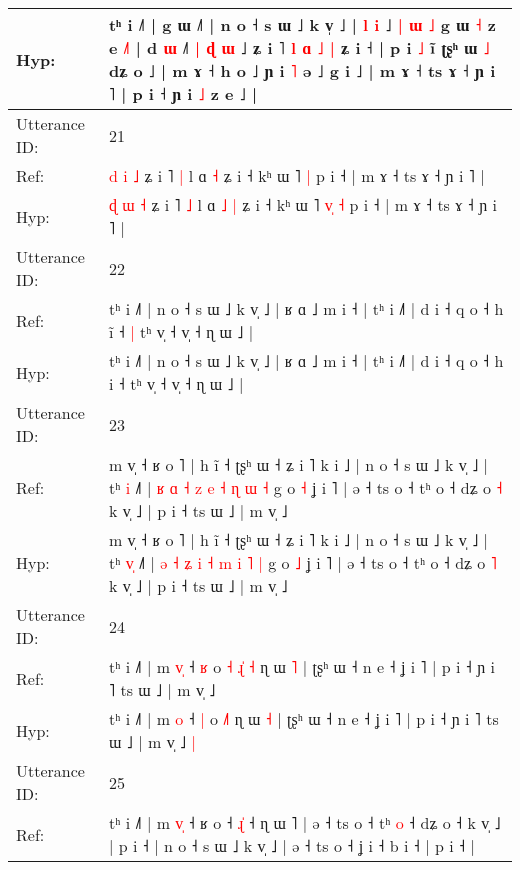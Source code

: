 \documentclass[10pt]{article}
\DeclareRobustCommand{\hl}[1]{{\textcolor{red}{#1}}}
\begin{document}
\begin{longtable}{ll}
 \\
Hyp: & tʰ i ˩˥ | g ɯ ˩˥ | n o ˧ s ɯ ˩ k v̩ ˩ | \hl{l} \hl{i} ˩\hl{}\hl{} \hl{|} \hl{ɯ} \hl{˩} g ɯ \hl{˧} z e \hl{˩}˥ | d \hl{ɯ} ˩˥\hl{ }\hl{|} \hl{ɖ} \hl{ɯ} ˩ ʑ i ˥ \hl{l} \hl{ɑ} \hl{˩} \hl{|} ʑ i ˧\hl{} | p i\hl{}\hl{} \hl{˩} ĩ\hl{}\hl{} ʈʂʰ ɯ \hl{˩} dʑ o ˩ | m ɤ ˧ h o ˩ ɲ i\hl{}\hl{} \hl{˥} ə ˩ g i ˩ | m ɤ ˧ ts ɤ ˧ ɲ i ˥ | p i ˧ ɲ i \hl{˩} z e\hl{}\hl{}\hl{}\hl{}\hl{} ˩ |
 \\
\midrule
Utterance ID: & 21 \\
Ref: & \hl{d} \hl{i} \hl{˩} ʑ i ˥ \hl{|} l ɑ\hl{}\hl{} \hl{˧} ʑ i ˧ kʰ ɯ ˥\hl{}\hl{}\hl{} \hl{|} p i ˧ | m ɤ ˧ ts ɤ ˧ ɲ i ˥ |
 \\
Hyp: & \hl{ɖ} \hl{ɯ} \hl{˧} ʑ i ˥ \hl{˩} l ɑ\hl{ }\hl{˩} \hl{|} ʑ i ˧ kʰ ɯ ˥\hl{ }\hl{v}\hl{̩} \hl{˧} p i ˧ | m ɤ ˧ ts ɤ ˧ ɲ i ˥ |
 \\
\midrule
Utterance ID: & 22 \\
Ref: & tʰ i ˩˥ | n o ˧ s ɯ ˩ k v̩ ˩ | ʁ ɑ ˩ m i ˧ | tʰ i ˩˥ | d i ˧ q o ˧ h i\hl{̃} ˧\hl{ }\hl{|} tʰ v̩ ˧ v̩ ˧ ɳ ɯ ˩ |
 \\
Hyp: & tʰ i ˩˥ | n o ˧ s ɯ ˩ k v̩ ˩ | ʁ ɑ ˩ m i ˧ | tʰ i ˩˥ | d i ˧ q o ˧ h i\hl{} ˧\hl{}\hl{} tʰ v̩ ˧ v̩ ˧ ɳ ɯ ˩ |
 \\
\midrule
Utterance ID: & 23 \\
Ref: & m v̩ ˧ ʁ o ˥ | h ĩ ˧ ʈʂʰ ɯ ˧ ʑ i ˥ k i ˩ | n o ˧ s ɯ ˩ k v̩ ˩ | tʰ \hl{}\hl{i} ˩˥ | \hl{ʁ} \hl{ɑ} \hl{˧} \hl{z} \hl{e} \hl{˧} \hl{ɳ} \hl{ɯ} \hl{˧} g o \hl{˧} ʝ i ˥ | ə ˧ ts o ˧ tʰ o ˧ dʑ o \hl{˧} k v̩ ˩ | p i ˧ ts ɯ ˩ | m v̩ ˩
 \\
Hyp: & m v̩ ˧ ʁ o ˥ | h ĩ ˧ ʈʂʰ ɯ ˧ ʑ i ˥ k i ˩ | n o ˧ s ɯ ˩ k v̩ ˩ | tʰ \hl{v}\hl{̩} ˩˥ | \hl{ə} \hl{˧} \hl{ʑ} \hl{i} \hl{˧} \hl{m} \hl{i} \hl{˥} \hl{|} g o \hl{˩} ʝ i ˥ | ə ˧ ts o ˧ tʰ o ˧ dʑ o \hl{˥} k v̩ ˩ | p i ˧ ts ɯ ˩ | m v̩ ˩
 \\
\midrule
Utterance ID: & 24 \\
Ref: & tʰ i ˩˥ | m \hl{v}\hl{̩} ˧ \hl{ʁ} o\hl{ }\hl{˧} \hl{ɻ}\hl{̍}\hl{ }\hl{˧} ɳ ɯ \hl{˥} | ʈʂʰ ɯ ˧ n e ˧ ʝ i ˥ | p i ˧ ɲ i ˥ ts ɯ ˩ | m v̩ ˩\hl{}\hl{}
 \\
Hyp: & tʰ i ˩˥ | m \hl{}\hl{o} ˧ \hl{|} o\hl{}\hl{} \hl{}\hl{}\hl{˩}\hl{˥} ɳ ɯ \hl{˧} | ʈʂʰ ɯ ˧ n e ˧ ʝ i ˥ | p i ˧ ɲ i ˥ ts ɯ ˩ | m v̩ ˩\hl{ }\hl{|}
 \\
\midrule
Utterance ID: & 25 \\
Ref: & tʰ i ˩˥ | m \hl{}\hl{v}\hl{̩} ˧ ʁ o ˧ \hl{ɻ}\hl{̍} ˧ ɳ ɯ ˥ | ə ˧ ts o ˧ tʰ \hl{}\hl{o} ˧ dʑ o ˧ k v̩ ˩ | p i ˧ | n o ˧ s ɯ ˩ k v̩ ˩ | ə ˧ ts o ˧ ʝ i ˧ b i ˧ | p i ˧ |

\end{longtable}
\end{document}
